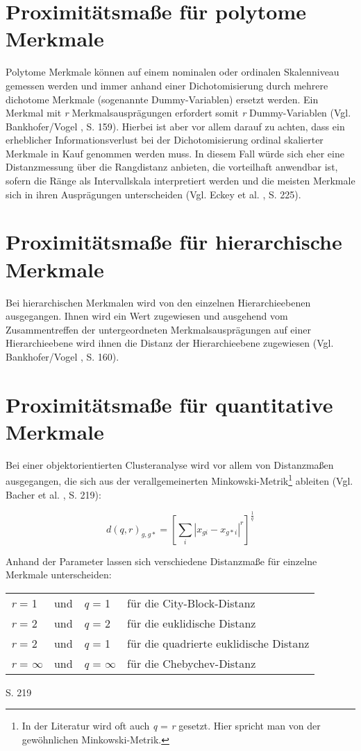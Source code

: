 \section{Proximitätsmaße für polytome Merkmale}
Polytome Merkmale können auf einem nominalen oder ordinalen Skalenniveau gemessen werden und immer anhand einer Dichotomisierung durch mehrere dichotome Merkmale (sogenannte Dummy-Variablen) ersetzt werden. Ein Merkmal mit \textit{r} Merkmalsausprägungen erfordert somit \textit{r} Dummy-Variablen (Vgl. Bankhofer/Vogel \cite{Bankhofer.2008}, S. 159). Hierbei ist aber vor allem darauf zu achten, dass ein erheblicher Informationsverlust bei der Dichotomisierung ordinal skalierter Merkmale in Kauf genommen werden muss. In diesem Fall würde sich eher eine Distanzmessung über die Rangdistanz anbieten, die vorteilhaft anwendbar ist, sofern die Ränge als Intervallskala interpretiert werden und die meisten Merkmale sich in ihren Ausprägungen unterscheiden (Vgl. Eckey et al. \cite{Eckey.2002}, S. 225).

\section{Proximitätsmaße für hierarchische Merkmale}

Bei hierarchischen Merkmalen wird von den einzelnen Hierarchieebenen ausgegangen. Ihnen wird ein Wert zugewiesen und ausgehend vom Zusammentreffen der untergeordneten Merkmalsausprägungen auf einer Hierarchieebene wird ihnen die Distanz der Hierarchieebene zugewiesen (Vgl. Bankhofer/Vogel \cite{Bankhofer.2008}, S. 160).

\section{Proximitätsmaße für quantitative Merkmale}
Bei einer objektorientierten Clusteranalyse wird vor allem von Distanzmaßen ausgegangen, die sich aus der verallgemeinerten Minkowski-Metrik\footnote{In der Literatur wird oft auch \textit{q} = \textit{r} gesetzt. Hier spricht man von der gewöhnlichen Minkowski-Metrik.} ableiten (Vgl. Bacher et al. \cite{Bacher.2010}, S. 219):

\begin{equation}
d(q,r)_{g,g*} = 
\left[	\sum_{i} |x_{gi} - x_{g*i}|^r	\right]^\frac{1}{q}
\end{equation}

Anhand der Parameter lassen sich verschiedene Distanzmaße für einzelne Merkmale unterscheiden: 
\begin{center}
\begin{tabular}{lcll}
	\textit{r} = 1 & und & \textit{q} = 1 & für die City-Block-Distanz \\
	\textit{r} = 2 & und & \textit{q} = 2 & für die euklidische Distanz \\
	\textit{r} = 2 & und & \textit{q} = 1 & für die quadrierte euklidische Distanz \\
	\textit{r} = $\infty$ & und & \textit{q} = $\infty$ & für die Chebychev-Distanz \\
\end{tabular}
\end{center}
\cite{Bacher.2010} S. 219

